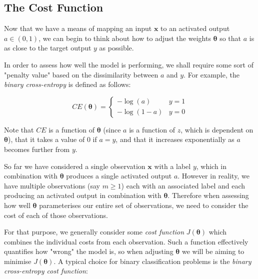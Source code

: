 \documentclass{article}[11pt]
\begin{document}
        
        
    \subsection{The Cost Function}
    \label{sec:costfun}
        
        Now that we have a means of mapping an input $\mathbf{x}$ to an activated output $a \in (0, 1)$, we can begin to think about how to adjust the weights $\boldsymbol{\theta}$ so that $a$ is as close to the target output $y$ as possible.
        
        In order to assess how well the model is performing, we shall require some sort of "penalty value" based on the dissimilarity between $a$ and $y$. For example, the \textit{binary cross-entropy} is defined as follows:
        
        $$
        CE(\boldsymbol{\theta}) = \begin{cases}
            -\log(a) & y = 1 \\
            -\log(1-a) & y = 0
        \end{cases}
        $$
        
        
        
        
        Note that $CE$ is a function of $\boldsymbol{\theta}$ (since $a$ is a function of $z$, which is dependent on $\boldsymbol{\theta}$), that it takes a value of 0 if $a = y$, and that it increases exponentially as $a$ becomes further from $y$.
        
        So far we have considered a single observation $\mathbf{x}$ with a label $y$, which in combination with $\boldsymbol{\theta}$ produces a single activated output $a$. However in reality, we have multiple observations (say $m \geq 1$) each with an associated label and each producing an activated output in combination with $\boldsymbol{\theta}$. Therefore when assessing how well $\boldsymbol{\theta}$ parameterises our entire set of observations, we need to consider the cost of each of those observations.
        
        For that purpose, we generally consider some \textit{cost function} $J(\boldsymbol{\theta})$ which combines the individual costs from each observation. Such a function effectively quantifies how "wrong" the model is, so when adjusting $\boldsymbol{\theta}$ we will be aiming to minimise $J(\boldsymbol{\theta})$. A typical choice for binary classification problems is the \textit{binary cross-entropy cost function}:
        
\end{document}

